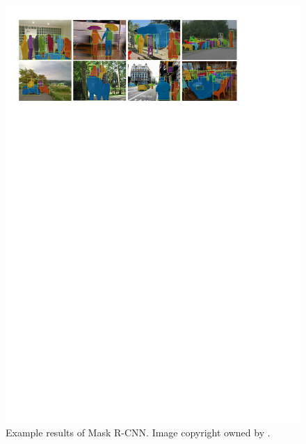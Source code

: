 \begin{figure}[!h]
	\centering
	\includegraphics[width=\fig\textwidth]{2-02.pdf}
    \caption[Example results of Mask R-CNN]{Example results of Mask R-CNN. Image copyright owned by \cite{maskrcnn}.}
    \label{fig:rcnnres}
\end{figure}